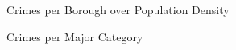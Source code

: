 \documentclass[12pt]{beamer}
\begin{document}
        \begin{frame}{Crimes per Borough over Population Density}
            \begin{figure}
                \centering
            \end{figure}
        \end{frame}

        \begin{frame}{Crimes per Major Category}
            \begin{figure}
                \centering
            \end{figure}
        \end{frame}
\end{document}
